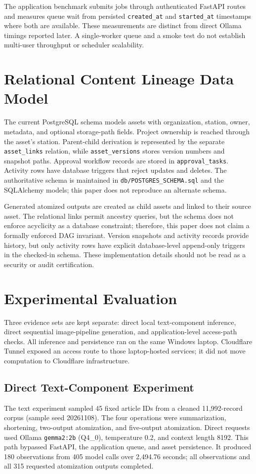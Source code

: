 \documentclass[conference]{IEEEtran}
\begin{document}
The application benchmark submits jobs through authenticated FastAPI routes and measures queue wait from persisted \texttt{created\_at} and \texttt{started\_at} timestamps where both are available. These measurements are distinct from direct Ollama timings reported later. A single-worker queue and a smoke test do not establish multi-user throughput or scheduler scalability.


\section{Relational Content Lineage Data Model}
The current PostgreSQL schema models assets with organization, station, owner, metadata, and optional storage-path fields. Project ownership is reached through the asset's station. Parent-child derivation is represented by the separate \texttt{asset\_links} relation, while \texttt{asset\_versions} stores version numbers and snapshot paths. Approval workflow records are stored in \texttt{approval\_tasks}. Activity rows have database triggers that reject updates and deletes. The authoritative schema is maintained in \texttt{db/POSTGRES\_SCHEMA.sql} and the SQLAlchemy models; this paper does not reproduce an alternate schema.

Generated atomized outputs are created as child assets and linked to their source asset. The relational links permit ancestry queries, but the schema does not enforce acyclicity as a database constraint; therefore, this paper does not claim a formally enforced DAG invariant. Version snapshots and activity records provide history, but only activity rows have explicit database-level append-only triggers in the checked-in schema. These implementation details should not be read as a security or audit certification.

\section{Experimental Evaluation}
Three evidence sets are kept separate: direct local text-component inference, direct sequential image-pipeline generation, and application-level access-path checks. All inference and persistence ran on the same Windows laptop. Cloudflare Tunnel exposed an access route to those laptop-hosted services; it did not move computation to Cloudflare infrastructure.

\subsection{Direct Text-Component Experiment}
The text experiment sampled 45 fixed article IDs from a cleaned 11,992-record corpus (sample seed 20261108). The four operations were summarization, shortening, two-output atomization, and five-output atomization. Direct requests used Ollama \texttt{gemma2:2b} (Q4\_0), temperature 0.2, and context length 8192. This path bypassed FastAPI, the application queue, and asset persistence. It produced 180 observations from 405 model calls over 2,494.76 seconds; all observations and all 315 requested atomization outputs completed.
\end{document}
